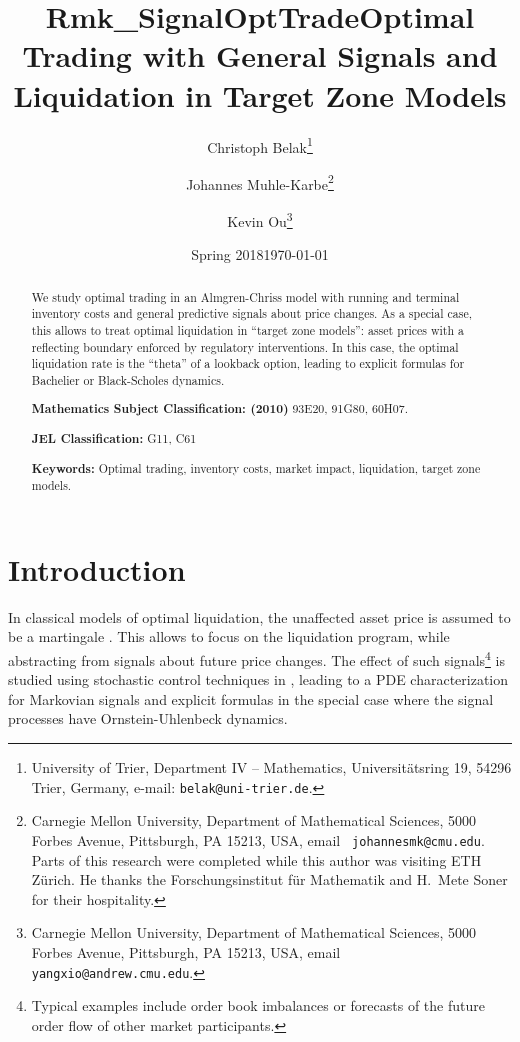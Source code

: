 \documentclass[11pt]{article}
\title{Rmk_SignalOptTrade}
\date{Spring 2018}
\numberwithin{equation}{section}
\theoremstyle{definition}
\theoremstyle{remark}
\begin{document}
\title{Optimal Trading with General Signals and \\ Liquidation in Target Zone Models}

\author{
Christoph Belak\thanks{University of Trier, Department IV -- Mathematics, Universit\"atsring 19, 54296 Trier, Germany, e-mail: \texttt{belak@uni-trier.de}.}
\and
Johannes Muhle-Karbe\thanks{Carnegie Mellon University, Department of Mathematical Sciences, 5000 Forbes Avenue, Pittsburgh, PA 15213, USA, email \texttt{ johannesmk@cmu.edu}. Parts of this research were completed while this author was visiting ETH Z\"urich. He thanks the Forschungsinstitut f\"ur Mathematik and H.~Mete Soner for their hospitality. }
\and
Kevin Ou\thanks{Carnegie Mellon University, Department of Mathematical Sciences, 5000 Forbes Avenue, Pittsburgh, PA 15213, USA, email \texttt{ yangxio@andrew.cmu.edu}.}
}

\date{\today}

\maketitle

\begin{abstract}
We study optimal trading in an Almgren-Chriss model with running and terminal inventory costs and  general predictive signals about price changes. As a special case, this allows to treat optimal liquidation in ``target zone models'': asset prices with a reflecting boundary enforced by regulatory interventions. In this case, the optimal liquidation rate is the ``theta'' of a lookback option, leading to explicit formulas for Bachelier or Black-Scholes dynamics.
 
\bigskip
\noindent\textbf{Mathematics Subject Classification: (2010)} 93E20, 91G80, 60H07.

\bigskip
\noindent\textbf{JEL Classification:} G11, C61

\bigskip
\noindent\textbf{Keywords:} Optimal trading, inventory costs, market impact, liquidation, target zone models.

\end{abstract}




\section{Introduction}

In classical models of optimal liquidation, the unaffected asset price is assumed to be a martingale \cite{bertsimas.lo.98,almgren2001optimal,obizhaeva.wang.13,alfonsi.al.10,predoiu.al.11}. This allows to focus on the liquidation program, while abstracting from signals about future price changes. The effect of such signals\footnote{Typical examples include order book imbalances or forecasts of the future order flow of other market participants.} is studied using stochastic control techniques in \cite{cartea.jaimungal.16,lehalle2017incorporating}, leading to a PDE characterization for Markovian signals and explicit formulas in the special case where the signal processes have Ornstein-Uhlenbeck dynamics. 
\end{document}
